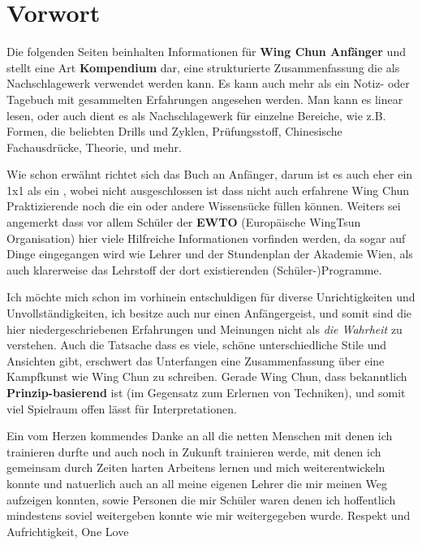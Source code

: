 \section*{Vorwort}


Die folgenden Seiten beinhalten Informationen f\"ur \textbf{Wing Chun Anf\"anger} und stellt eine Art \textbf{Kompendium} dar, eine strukturierte Zusammenfassung die als Nachschlagewerk verwendet werden kann. Es kann auch mehr als ein Notiz- oder Tagebuch mit gesammelten Erfahrungen angesehen werden. Man kann es linear lesen, oder auch dient es als Nachschlagewerk f\"ur einzelne Bereiche, wie z.B. Formen, die beliebten Drills und Zyklen, Pr\"ufungsstoff, Chinesische Fachausdr\"ucke, Theorie, und mehr.


Wie schon erw\"ahnt richtet sich das Buch an Anf\"anger, darum ist es auch eher ein 1x1 als ein , wobei nicht ausgeschlossen ist dass nicht auch erfahrene Wing Chun Praktizierende noch die ein oder andere Wissens\"ucke f\"ullen k\"onnen. Weiters sei angemerkt dass vor allem Sch\"uler der \textbf{EWTO} (Europ\"aische WingTsun Organisation) hier viele Hilfreiche Informationen vorfinden werden, da sogar auf Dinge eingegangen wird wie Lehrer und der Stundenplan der Akademie Wien, als auch klarerweise das Lehrstoff der dort existierenden (Sch\"uler-)Programme.



Ich m\"ochte mich schon im vorhinein entschuldigen f\"ur diverse Unrichtigkeiten und Unvollst\"andigkeiten, ich besitze auch nur einen Anf\"angergeist, und somit sind die hier niedergeschriebenen Erfahrungen und Meinungen nicht als \textit{die Wahrheit} zu verstehen. Auch die Tatsache dass es viele, sch\"one unterschiedliche Stile und Ansichten gibt, erschwert das Unterfangen eine Zusammenfassung \"uber eine Kampfkunst wie Wing Chun zu schreiben. Gerade Wing Chun, dass bekanntlich \textbf{Prinzip-basierend} ist (im Gegensatz zum Erlernen von Techniken), und somit viel Spielraum offen l\"asst f\"ur Interpretationen.


Ein vom Herzen kommendes Danke an all die netten Menschen mit denen ich trainieren durfte und auch noch in Zukunft trainieren werde, mit denen ich gemeinsam durch Zeiten harten Arbeitens lernen und mich weiterentwickeln konnte und natuerlich auch an all meine eigenen Lehrer die mir meinen Weg aufzeigen konnten, sowie Personen die mir Sch\"uler waren denen ich hoffentlich mindestens soviel weitergeben konnte wie mir weitergegeben wurde. Respekt und Aufrichtigkeit, One Love
